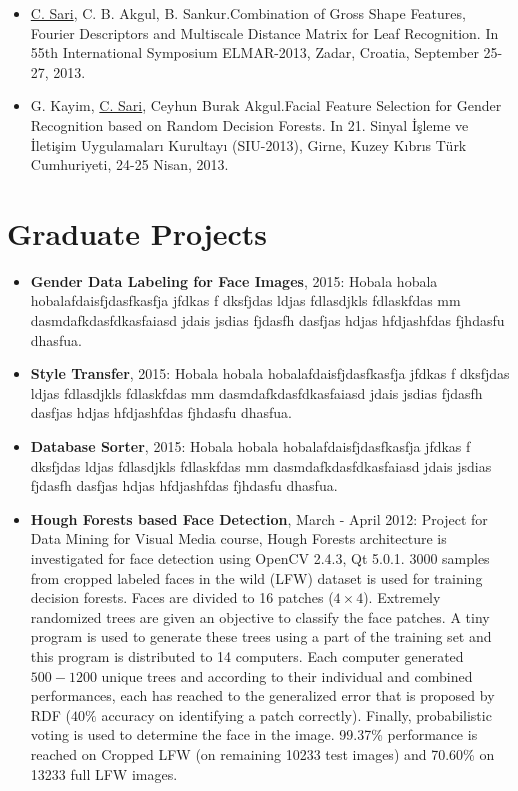\documentclass[margin]{res}
\begin{document}
\begin{resume}
		\begin{itemize}
			\item \underline{C. Sari}, C. B. Akgul, B. Sankur.Combination of Gross Shape Features, Fourier Descriptors and Multiscale Distance Matrix for Leaf Recognition. In 55th International Symposium ELMAR-2013, Zadar, Croatia, September 25-27, 2013.
			\item G. Kayim, \underline{C. Sari}, Ceyhun Burak Akgul.Facial Feature Selection for Gender Recognition based on Random Decision Forests. In 21. Sinyal {\.I}\c{s}leme ve {\.I}leti\c{s}im Uygulamalar{\i} Kurultay{\i} (SIU-2013), Girne, Kuzey K{\i}br{\i}s T\"{u}rk Cumhuriyeti, 24-25 Nisan, 2013.
		\end{itemize}
		\normalsize{\section{Graduate Projects}}
		\begin{itemize} \itemsep -2pt %
			
			\item {\bf Gender Data Labeling for Face Images}, 2015: Hobala hobala hobalafdaisfjdasfkasfja jfdkas f dksfjdas ldjas fdlasdjkls fdlaskfdas mm dasmdafkdasfdkasfaiasd jdais jsdias fjdasfh dasfjas hdjas hfdjashfdas fjhdasfu dhasfua.\\
			
			\item {\bf Style Transfer}, 2015: Hobala hobala hobalafdaisfjdasfkasfja jfdkas f dksfjdas ldjas fdlasdjkls fdlaskfdas mm dasmdafkdasfdkasfaiasd jdais jsdias fjdasfh dasfjas hdjas hfdjashfdas fjhdasfu dhasfua.\\
			
			\item {\bf Database Sorter}, 2015: Hobala hobala hobalafdaisfjdasfkasfja jfdkas f dksfjdas ldjas fdlasdjkls fdlaskfdas mm dasmdafkdasfdkasfaiasd jdais jsdias fjdasfh dasfjas hdjas hfdjashfdas fjhdasfu dhasfua.\\
			
			\item {\bf Hough Forests based Face Detection}, March - April 2012: Project for Data Mining for Visual Media course, Hough Forests architecture is investigated for face detection using OpenCV 2.4.3, Qt 5.0.1. 3000 samples from cropped labeled faces in the wild (LFW) dataset is used for training decision forests. Faces are divided to 16 patches ($4\times4$). Extremely randomized trees are given an objective to classify the face patches. A tiny program is used to generate these trees using a part of the training set and this program is distributed to 14 computers. Each computer generated $500 - 1200$ unique trees and according to their individual and combined performances, each has reached to the generalized error that is proposed by RDF ($40\%$ accuracy on identifying a patch correctly). Finally, probabilistic voting is used to determine the face in the image. 99.37\% performance is reached on Cropped LFW (on remaining 10233 test images) and 70.60\% on 13233 full LFW images.
			

\end{itemize}
\end{resume}
\end{document}
